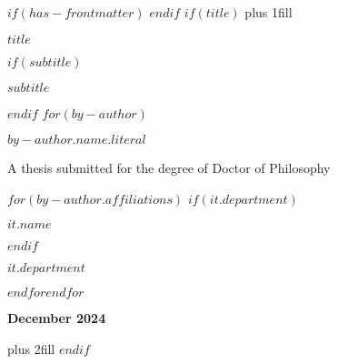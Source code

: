 $if(has-frontmatter)$
\frontmatter
$endif$
$if(title)$
\cleardoublepage
\thispagestyle{empty}
\hbox{}\vskip 0cm plus 1fill
{\centering\Huge\bfseries $title$ \par}
$if(subtitle)$
\vspace{3ex}
{\centering\Large\bfseries $subtitle$ \par}
$endif$
\vspace{7ex}
$for(by-author)$
{\centering\LARGE\bfseries $by-author.name.literal$ \par}
\vspace{11ex}
{\centering\Large A thesis submitted for the degree of Doctor of Philosophy \par}
\vspace{2ex}
$for(by-author.affiliations)$%
$if(it.department)$%
{\centering\bfseries\Large $it.name$ \par}
\vspace{2ex}
$endif$%
{\centering\Large $it.department$ \par}
$endfor$$endfor$%
\vspace{6ex}
{\centering\bfseries\Large December 2024 \par}
\vskip 0cm plus 2fill
$endif$

